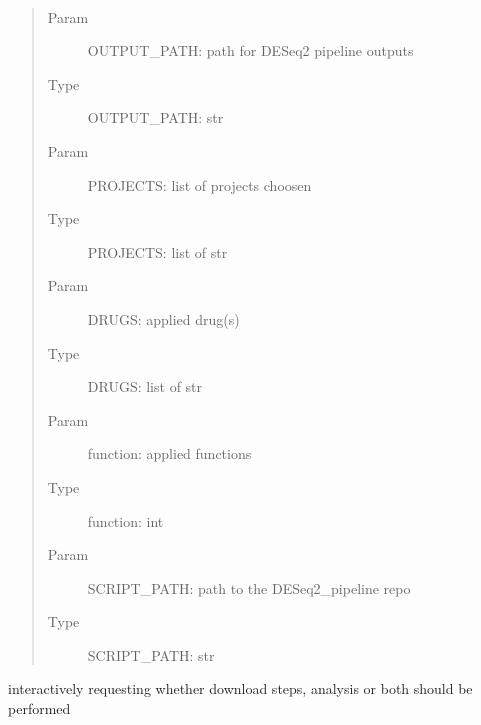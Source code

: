 \documentclass[letterpaper,10pt,english]{sphinxmanual}
\begin{document}
\begin{fulllineitems}
\label{\detokenize{index:choose_therapy.Choose_path_and_option}}~\begin{quote}\begin{description}
\item[{Param}] \leavevmode
\sphinxAtStartPar
OUTPUT\_PATH: path for DESeq2 pipeline outputs

\item[{Type}] \leavevmode
\sphinxAtStartPar
OUTPUT\_PATH: str

\item[{Param}] \leavevmode
\sphinxAtStartPar
PROJECTS: list of projects choosen

\item[{Type}] \leavevmode
\sphinxAtStartPar
PROJECTS: list of str

\item[{Param}] \leavevmode
\sphinxAtStartPar
DRUGS: applied drug(s)

\item[{Type}] \leavevmode
\sphinxAtStartPar
DRUGS: list of str

\item[{Param}] \leavevmode
\sphinxAtStartPar
function: applied functions

\item[{Type}] \leavevmode
\sphinxAtStartPar
function: int

\item[{Param}] \leavevmode
\sphinxAtStartPar
SCRIPT\_PATH: path to the DESeq2\_pipeline repo

\item[{Type}] \leavevmode
\sphinxAtStartPar
SCRIPT\_PATH: str

\end{description}\end{quote}

\sphinxAtStartPar
interactively requesting whether download steps, analysis or both should be
performed

\end{fulllineitems}

\end{document}

